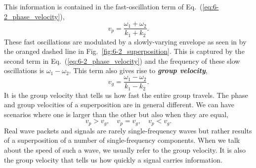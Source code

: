 This information is contained in the fast-oscillation term of Eq.~(\ref{eq:6-2_phase_velocity}),
\begin{equation}
    v_p = \frac{\omega_1 + \omega_2}{k_1 + k_2}.
\end{equation}
These fast oscillations are modulated by a slowly-varying envelope as seen in by the oranged dashed line in Fig.~\ref{fig:6-2_superposition}.
This is captured by the second term in Eq.~(\ref{eq:6-2_phase_velocity}) and the frequency of these slow oscillations is $\omega_1-\omega_2$.
This term also gives rise to \textit{\textbf{group velocity}},
\begin{equation}
    v_g = \frac{\omega_1 - \omega_2}{k_1 - k_2}.
\end{equation}
It is the group velocity that tells us how fast the entire group travels.
The phase and group velocities of a superposition are in general different.
We can have scenarios where one is larger than the other but also when they are equal,
\begin{equation}
    v_p > v_g, \quad v_p = v_g, \quad v_p < v_g.
\end{equation}
Real wave packets and signals are rarely single-frequency waves but rather results of a superposition of a number of single-frequency components.
When we talk about the speed of such a wave, we usually refer to the group velocity.
It is also the group velocity that tells us how quickly a signal carries information.


